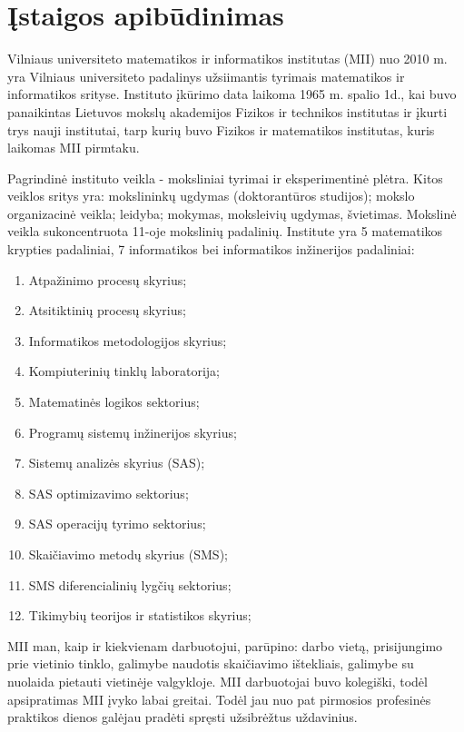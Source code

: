 
\section{Įstaigos apibūdinimas}

Vilniaus universiteto matematikos ir informatikos institutas (MII) nuo 2010 m. yra Vilniaus 
universiteto padalinys užsiimantis tyrimais matematikos ir informatikos srityse.
Instituto įkūrimo data laikoma 1965 m. spalio 1d., kai buvo panaikintas Lietuvos
mokslų akademijos Fizikos ir technikos institutas ir įkurti trys nauji
institutai, tarp kurių buvo Fizikos ir matematikos institutas, kuris laikomas 
MII pirmtaku. 

Pagrindinė instituto veikla - moksliniai tyrimai ir eksperimentinė plėtra. Kitos
veiklos sritys yra: mokslininkų ugdymas (doktorantūros studijos); mokslo 
organizacinė veikla; leidyba; mokymas, moksleivių ugdymas, švietimas.
Mokslinė veikla sukoncentruota 11-oje mokslinių padalinių. Institute yra 5
matematikos krypties padaliniai, 7 informatikos bei informatikos inžinerijos 
padaliniai:
\begin{enumerate}
  \item Atpažinimo procesų skyrius;
  \item Atsitiktinių procesų skyrius;
  \item Informatikos metodologijos skyrius;
  \item Kompiuterinių tinklų laboratorija;
  \item Matematinės logikos sektorius;
  \item Programų sistemų inžinerijos skyrius;
  \item Sistemų analizės skyrius (SAS);
  \item SAS optimizavimo sektorius;
  \item SAS operacijų tyrimo sektorius;
  \item Skaičiavimo metodų skyrius (SMS);
  \item SMS diferencialinių lygčių sektorius;
  \item Tikimybių teorijos ir statistikos skyrius;
\end{enumerate}

MII man, kaip ir kiekvienam darbuotojui, parūpino: darbo vietą, prisijungimo prie 
vietinio tinklo, galimybe naudotis skaičiavimo ištekliais, galimybe su nuolaida 
pietauti vietinėje valgykloje. MII darbuotojai buvo kolegiški, todėl apsipratimas
MII įvyko labai greitai. Todėl jau nuo pat pirmosios profesinės praktikos dienos
galėjau pradėti spręsti užsibrėžtus uždavinius.
